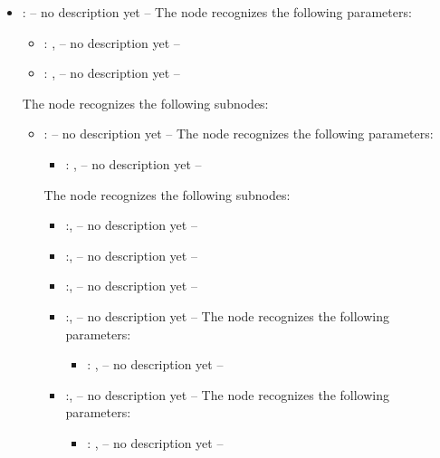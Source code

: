 \begin{itemize}
    \item {}:
      -- no description yet --
      The  node recognizes the following parameters:
        \begin{itemize}
          \item {}: , 
            -- no description yet --
          \item {}: , 
            -- no description yet --
      \end{itemize}

      The  node recognizes the following subnodes:
      \begin{itemize}
        \item {}:
          -- no description yet --
          The  node recognizes the following parameters:
            \begin{itemize}
              \item {}: , 
                -- no description yet --
          \end{itemize}

          The  node recognizes the following subnodes:
          \begin{itemize}
            \item {}:, 
              -- no description yet --

            \item {}:, 
              -- no description yet --

            \item {}:, 
              -- no description yet --

            \item {}:, 
              -- no description yet --
              The  node recognizes the following parameters:
                \begin{itemize}
                  \item {}: , 
                    -- no description yet --
              \end{itemize}

            \item {}:, 
              -- no description yet --
              The  node recognizes the following parameters:
                \begin{itemize}
                  \item {}: , 
                    -- no description yet --
              \end{itemize}


\end{itemize}
\end{itemize}
\end{itemize}
